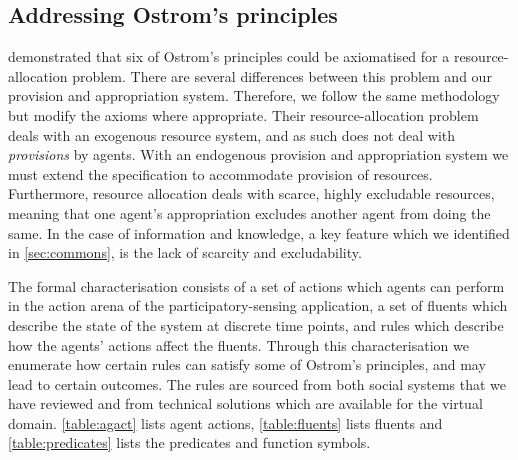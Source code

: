 \subsection{Addressing Ostrom's principles}
%

 demonstrated that six of Ostrom's principles could be axiomatised for a resource-allocation problem. There are several differences between this problem and our provision and appropriation system. 
Therefore, we follow the same methodology but modify the axioms where appropriate. 
Their resource-allocation problem deals with an exogenous resource system, and as such does not deal with \emph{provisions} by agents. With an endogenous provision and appropriation system we must extend the specification to accommodate provision of resources.
Furthermore, resource allocation deals with scarce, highly excludable resources, meaning that  one agent's appropriation excludes another agent from doing the same. 
In the case of information and knowledge, a key feature which we identified in \autoref{sec:commons}, is the lack of scarcity and excludability. 

The formal characterisation consists of a set of actions which agents can perform in the action arena of the participatory-sensing application, a set of fluents which describe the state of the system at discrete time points, and rules which describe how the agents' actions affect the fluents. Through this characterisation we enumerate how certain rules can satisfy some of Ostrom's principles, and may lead to certain outcomes. The rules are sourced from both social systems that we have reviewed and from technical solutions which are available for the virtual domain. \autoref{table:agact} lists agent actions, \autoref{table:fluents} lists fluents and \autoref{table:predicates} lists the
predicates and function symbols.

